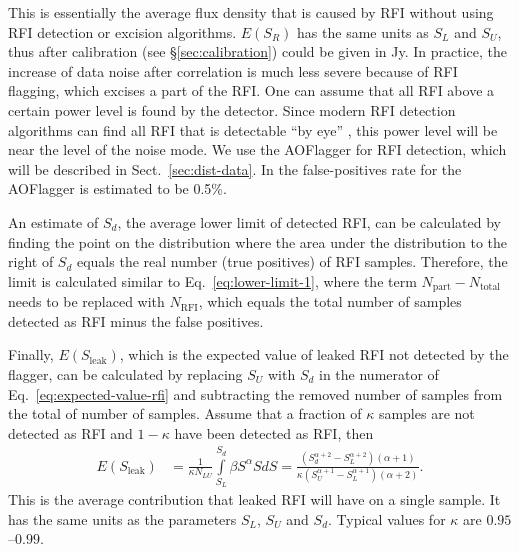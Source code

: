 \documentclass[useAMS,usenatbib]{mn2e}
\begin{document}
This is essentially the average flux density that is caused by RFI without using RFI detection or excision algorithms. $E(S_R)$ has the same units as $S_L$ and $S_U$, thus after calibration (see \S\ref{sec:calibration}) could be given in Jy. In practice, the increase of data noise after correlation is much less severe because of RFI flagging, which excises a part of the RFI. One can assume that all RFI above a certain power level is found by the detector. Since modern RFI detection algorithms can find all RFI that is detectable ``by eye'' \citep{post-correlation-rfi-classification}, this power level will be near the level of the noise mode. We use the AOFlagger for RFI detection, which will be described in Sect.~\ref{sec:dist-data}. In
\citet{lofar-radio-environment}
the false-positives rate for the AOFlagger is estimated to be 0.5\%.

An estimate of $S_d$, the average lower limit of detected RFI, can be calculated by finding the point on the distribution where the area under the distribution to the right of $S_d$ equals the real number (true positives) of RFI samples. Therefore, the limit is calculated similar to Eq.~\eqref{eq:lower-limit-1}, where the term $N_\textrm{part} - N_\textrm{total}$ needs to be replaced with $N_\textrm{RFI}$, which equals the total number of samples detected as RFI minus the false positives.

Finally, $E(S_\textrm{leak})$, which is the expected value of leaked RFI not detected by the flagger, can be calculated by replacing $S_U$ with $S_d$ in the numerator of Eq.~\eqref{eq:expected-value-rfi} and subtracting the removed number of samples from the total of number of samples. Assume that a fraction of $\kappa$ samples are not detected as RFI and $1-\kappa$ have been detected as RFI, then
\begin{align} \label{eq:expected-value-leaked-rfi}
E(S_\textrm{leak}) & = \frac{1}{\kappa N_{LU}}\int\limits_{S_L}^{S_d} \beta S^\alpha S dS
= \frac{\left( S_d^{\alpha+2} - S_L^{\alpha+2} \right) \left( \alpha+1 \right) } {\kappa \left( S_U^{\alpha+1} - S_L^{\alpha+1}\right) \left( \alpha+2 \right)}.
\end{align}
This is the average contribution that leaked RFI will have on a single sample. It has the same units as the parameters $S_L$, $S_U$ and $S_d$. Typical values for $\kappa$ are $0.95$--$0.99$.
\end{document}
